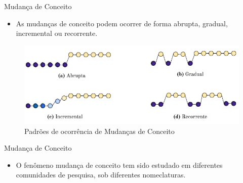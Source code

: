 \documentclass[10pt]{beamer}
\begin{document}
\begin{frame}{Mudança de Conceito}
    \begin{itemize}
        \item<1 -> As mudanças de conceito podem ocorrer de forma \alert{abrupta}, \alert{gradual}, \alert{incremental} ou \alert{recorrente}.
    \end{itemize}
    \begin{figure}[H]
        \begin{center}
            \includegraphics[scale=0.5]{imagens/concept_drift_patterns.png}
            \caption{Padrões de ocorrência de Mudanças de Conceito}
            \label{fig:concept_drift_patterns}
        \end{center}
    \end{figure}
\end{frame}

\begin{frame}{Mudança de Conceito}
    \begin{itemize}
        \item<1 -> O fenômeno mudança de conceito tem sido estudado em diferentes comunidades de pesquisa, sob diferentes nomeclaturas.
    \end{itemize}
    \begin{table}[!ht]
        \centering
        \caption{Terminologia - Mudança de Conceito \cite{Zliobaite:2010}}
        \label{tbl:taxonomy}
    \end{table}
\end{frame}
\end{document}
